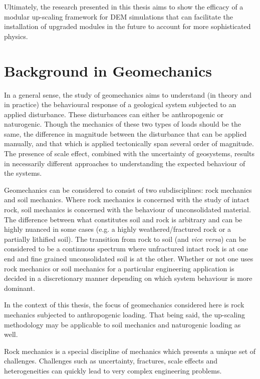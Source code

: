 Ultimately, the research presented in this thesis aims to show the efficacy of a modular up-scaling framework for DEM simulations that can facilitate the installation of upgraded modules in the future to account for more sophisticated physics.

\section{Background in Geomechanics}

In a general sense, the study of geomechanics aims to understand (in theory and in practice) the behavioural response of a geological system subjected to an applied disturbance. These disturbances can either be anthropogenic or naturogenic. Though the mechanics of these two types of loads should be the same, the difference in magnitude between the disturbance that can be applied manually, and that which is applied tectonically span several order of magnitude. The presence of scale effect, combined with the uncertainty of geosystems, results in necessarily different approaches to understanding the expected behaviour of the systems. 

Geomechanics can be considered to consist of two subdisciplines: rock mechanics and soil mechanics. Where rock mechanics is concerned with the study of intact rock, soil mechanics is concerned with the behaviour of unconsolidated material. The difference between what constitutes soil and rock is arbitrary and can be highly nuanced in some cases (e.g. a highly weathered/fractured rock or a partially lithified soil). The transition from rock to soil (and \textit{vice versa}) can be considered to be a continuous spectrum where unfractured intact rock is at one end and fine grained unconsolidated soil is at the other. Whether or not one uses rock mechanics or soil mechanics for a particular engineering application is decided in a discretionary manner depending on which system behaviour is more dominant.

In the context of this thesis, the focus of geomechanics considered here is rock mechanics subjected to anthropogenic loading. That being said, the up-scaling methodology may be applicable to soil mechanics and naturogenic loading as well.  

Rock mechanics is a special discipline of mechanics which presents a unique set of challenges. Challenges such as uncertainty, fractures, scale effects and heterogeneities can quickly lead to very complex engineering problems. 

